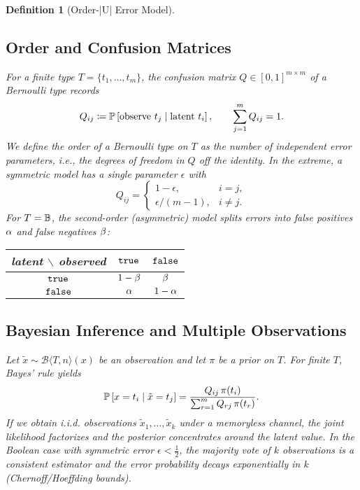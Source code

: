 \documentclass[11pt,final,hidelinks]{article}
\newtheorem{definition}[theorem]{Definition}
\newcommand{\bernoulli}[2]{\mathcal{B}\langle #1, #2 \rangle}
\begin{document}
\begin{definition}[Order-|U| Error Model]
\subsection{Order and Confusion Matrices}

For a finite type $T=\{t_1,\dots,t_m\}$, the \emph{confusion matrix} $Q\in[0,1]^{m\times m}$ of a Bernoulli type records
\begin{equation}
    Q_{ij} \coloneqq \mathbb{P}\left[\text{observe } t_j \mid \text{latent } t_i\right], \qquad \sum_{j=1}^m Q_{ij}=1.
\end{equation}
We define the \emph{order} of a Bernoulli type on $T$ as the number of independent error parameters, i.e., the degrees of freedom in $Q$ off the identity. In the extreme, a symmetric model has a single parameter $\epsilon$ with
\begin{equation}
    Q_{ij}=\begin{cases}1-\epsilon,& i=j,\\[2pt] \epsilon/(m-1),& i\neq j.\end{cases}
\end{equation}
For $T=\mathbb{B}$, the second-order (asymmetric) model splits errors into false positives $\alpha$ and false negatives $\beta$:
\begin{center}
\begin{tabular}{c|cc}
latent $\backslash$ observed & $\mathtt{true}$ & $\mathtt{false}$ \\ \hline
$\mathtt{true}$ & $1-\beta$ & $\beta$ \\
$\mathtt{false}$ & $\alpha$ & $1-\alpha$
\end{tabular}
\end{center}

\subsection{Bayesian Inference and Multiple Observations}

Let $\tilde{x}\sim\bernoulli{T}{n}(x)$ be an observation and let $\pi$ be a prior on $T$. For finite $T$, Bayes' rule yields
\begin{equation}
    \mathbb{P}\left[x=t_i\mid \tilde{x}=t_j\right] = \frac{Q_{ij}\,\pi(t_i)}{\sum_{r=1}^m Q_{rj}\,\pi(t_r)}.
\end{equation}
If we obtain i.i.d. observations $\tilde{x}_1,\dots,\tilde{x}_k$ under a memoryless channel, the joint likelihood factorizes and the posterior concentrates around the latent value. In the Boolean case with symmetric error $\epsilon<\tfrac12$, the majority vote of $k$ observations is a consistent estimator and the error probability decays exponentially in $k$ (Chernoff/Hoeffding bounds).


\end{definition}
\end{document}
